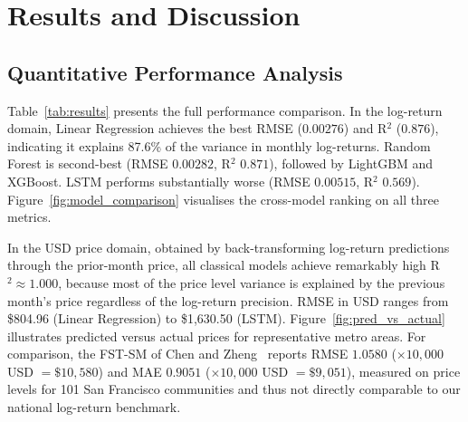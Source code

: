 \documentclass[runningheads]{llncs}
\begin{document}
\section{Results and Discussion}
\label{sec:results}

\subsection{Quantitative Performance Analysis}
\label{sec:results_quant}

Table~\ref{tab:results} presents the full performance comparison.
In the log-return domain, Linear Regression achieves the best
RMSE ($0.00276$) and R$^2$ ($0.876$), indicating it explains
87.6\% of the variance in monthly log-returns. Random Forest is
second-best (RMSE $0.00282$, R$^2$ $0.871$), followed by
LightGBM and XGBoost. LSTM performs substantially worse
(RMSE $0.00515$, R$^2$ $0.569$). Figure~\ref{fig:model_comparison}
visualises the cross-model ranking on all three metrics.

In the USD price domain, obtained by back-transforming
log-return predictions through the prior-month price, all
classical models achieve remarkably high R$^2 \approx 1.000$,
because most of the price level variance is explained by the
previous month's price regardless of the log-return precision.
RMSE in USD ranges from \$804.96 (Linear Regression) to
\$1{,}630.50 (LSTM). Figure~\ref{fig:pred_vs_actual} illustrates
predicted versus actual prices for representative metro areas.
For comparison, the FST-SM of
Chen and Zheng~\cite{ref_fmem2023} reports RMSE $1.0580$
($\times 10{,}000$ USD $= \$10{,}580$) and MAE $0.9051$
($\times 10{,}000$ USD $= \$9{,}051$), measured on price levels
for 101 San Francisco communities and thus not directly comparable
to our national log-return benchmark.
\end{document}
